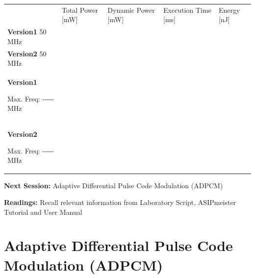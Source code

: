 \documentclass[
]{article}
\begin{document}
\begin{longtable}[]{@{}lllll@{}}
\toprule
\endhead
& Total Power {[}mW{]} & Dynamic Power {[}mW{]} & Execution Time
{[}ms{]} & Energy {[}nJ{]}\tabularnewline
\textbf{Version1} 50 MHz & & & &\tabularnewline
\textbf{Version2} 50 MHz & & & &\tabularnewline
\begin{minipage}[t]{0.17\columnwidth}\raggedright
\textbf{Version1}

Max. Freq: -\/-\/-\/-\/-MHz\strut
\end{minipage} & \begin{minipage}[t]{0.17\columnwidth}\raggedright
\strut
\end{minipage} & \begin{minipage}[t]{0.17\columnwidth}\raggedright
\strut
\end{minipage} & \begin{minipage}[t]{0.17\columnwidth}\raggedright
\strut
\end{minipage} & \begin{minipage}[t]{0.17\columnwidth}\raggedright
\strut
\end{minipage}\tabularnewline
\begin{minipage}[t]{0.17\columnwidth}\raggedright
\textbf{Version2}

Max. Freq: -\/-\/-\/-\/-MHz\strut
\end{minipage} & \begin{minipage}[t]{0.17\columnwidth}\raggedright
\strut
\end{minipage} & \begin{minipage}[t]{0.17\columnwidth}\raggedright
\strut
\end{minipage} & \begin{minipage}[t]{0.17\columnwidth}\raggedright
\strut
\end{minipage} & \begin{minipage}[t]{0.17\columnwidth}\raggedright
\strut
\end{minipage}\tabularnewline
\bottomrule
\end{longtable}

\textbf{Next Session:} Adaptive Differential Pulse Code Modulation
(ADPCM)

\textbf{Readings:} Recall relevant information from Laboratory Script,
ASIPmeister Tutorial and User Manual

\hypertarget{adaptive-differential-pulse-code-modulation-adpcm}{%
\section{\texorpdfstring{Adaptive \textbf{Differential Pulse Code
Modulation
(ADPCM)}}{Adaptive Differential Pulse Code Modulation (ADPCM)}}\label{adaptive-differential-pulse-code-modulation-adpcm}}
\end{document}
